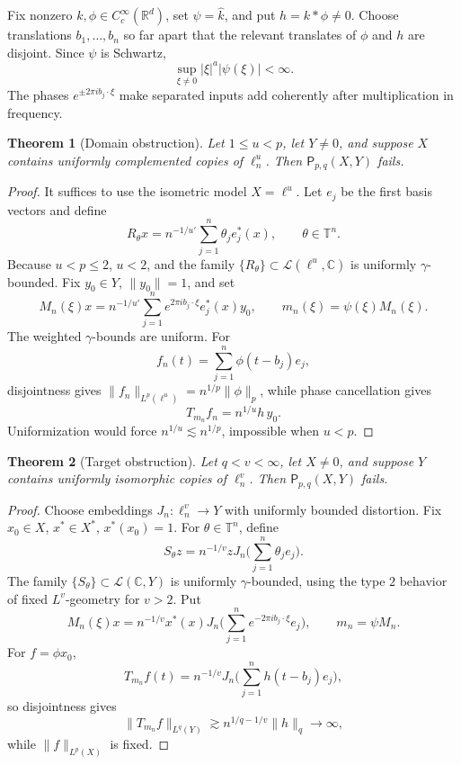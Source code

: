 \documentclass[11pt]{article}
\newtheorem{theorem}{Theorem}[section]
\newcommand{\R}{\mathbb R}
\newcommand{\C}{\mathbb C}
\newcommand{\T}{\mathbb T}
\newcommand{\cL}{\mathcal L}
\newcommand{\Pprop}{\mathsf P}
\newcommand{\gam}{\gamma}
\newcommand{\norm}[1]{\lVert #1\rVert}
\newcommand{\abs}[1]{\lvert #1\rvert}
\begin{document}
Fix nonzero \(k,\phi\in C_c^\infty(\R^d)\), set \(\psi=\widehat k\), and put
\(h=k*\phi\ne0\).  Choose translations \(b_1,\ldots,b_n\) so far apart that the
relevant translates of \(\phi\) and \(h\) are disjoint.  Since \(\psi\) is
Schwartz,
\[
  \sup_{\xi\ne0}\abs{\xi}^a\abs{\psi(\xi)}<\infty.
\]
The phases \(e^{\pm2\pi i b_j\cdot\xi}\) make separated inputs add coherently
after multiplication in frequency.

\begin{theorem}[Domain obstruction]\label{thm:domain-u}
Let \(1\le u<p\), let \(Y\ne0\), and suppose \(X\) contains uniformly
complemented copies of \(\ell^u_n\).  Then \(\Pprop_{p,q}(X,Y)\) fails.
\end{theorem}

\begin{proof}
It suffices to use the isometric model \(X=\ell^u\).  Let \(e_j\) be the first
basis vectors and define
\[
  R_\theta x=n^{-1/u'}\sum_{j=1}^n\theta_j e_j^*(x),\qquad \theta\in\T^n.
\]
Because \(u<p\le2\), \(u<2\), and the family \(\{R_\theta\}\subset\cL(\ell^u,\C)\)
is uniformly \(\gam\)-bounded.  Fix \(y_0\in Y\), \(\norm{y_0}=1\), and set
\[
  M_n(\xi)x=n^{-1/u'}\sum_{j=1}^n e^{2\pi i b_j\cdot\xi}e_j^*(x)y_0,\qquad
  m_n(\xi)=\psi(\xi)M_n(\xi).
\]
The weighted \(\gam\)-bounds are uniform.  For
\[
  f_n(t)=\sum_{j=1}^n\phi(t-b_j)e_j,
\]
disjointness gives \(\norm{f_n}_{L^p(\ell^u)}=n^{1/p}\norm{\phi}_p\), while
phase cancellation gives
\[
  T_{m_n}f_n=n^{1/u}h\,y_0.
\]
Uniformization would force \(n^{1/u}\lesssim n^{1/p}\), impossible when
\(u<p\).
\end{proof}

\begin{theorem}[Target obstruction]\label{thm:target-v}
Let \(q<v<\infty\), let \(X\ne0\), and suppose \(Y\) contains uniformly
isomorphic copies of \(\ell^v_n\).  Then \(\Pprop_{p,q}(X,Y)\) fails.
\end{theorem}

\begin{proof}
Choose embeddings \(J_n:\ell^v_n\to Y\) with uniformly bounded distortion.
Fix \(x_0\in X\), \(x^*\in X^*\), \(x^*(x_0)=1\).  For \(\theta\in\T^n\), define
\[
  S_\theta z=n^{-1/v}zJ_n\Big(\sum_{j=1}^n\theta_je_j\Big).
\]
The family \(\{S_\theta\}\subset\cL(\C,Y)\) is uniformly \(\gam\)-bounded, using
the type \(2\) behavior of fixed \(L^v\)-geometry for \(v>2\).  Put
\[
  M_n(\xi)x=n^{-1/v}x^*(x)J_n\Big(\sum_{j=1}^n e^{-2\pi i b_j\cdot\xi}e_j\Big),
  \qquad m_n=\psi M_n.
\]
For \(f=\phi x_0\),
\[
  T_{m_n}f(t)=n^{-1/v}J_n\Big(\sum_{j=1}^n h(t-b_j)e_j\Big),
\]
so disjointness gives
\[
  \norm{T_{m_n}f}_{L^q(Y)}\gtrsim n^{1/q-1/v}\norm h_q\to\infty,
\]
while \(\norm f_{L^p(X)}\) is fixed.
\end{proof}
\end{document}
